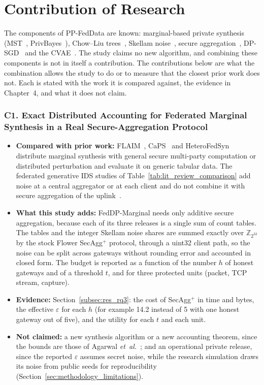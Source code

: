\section{Contribution of Research}\label{sec:contribution}
The components of PP-FedData are known: marginal-based private synthesis (MST~\cite{mckenna2021mst}, PrivBayes~\cite{zhang2017privbayes}), Chow--Liu trees~\cite{chow1968}, Skellam noise~\cite{agarwal2021}, secure aggregation~\cite{bell2020}, DP-SGD~\cite{abadi2016dpsgd} and the CVAE~\cite{sohn2015cvae}. The study claims no new algorithm, and combining these components is not in itself a contribution. The contributions below are what the combination allows the study to do or to measure that the closest prior work does not. Each is stated with the work it is compared against, the evidence in Chapter~4, and what it does not claim.

\subsubsection*{C1. Exact Distributed Accounting for Federated Marginal Synthesis in a Real Secure-Aggregation Protocol}
\begin{itemize}
    \item \textbf{Compared with prior work:} FLAIM~\cite{maddock2024}, CaPS~\cite{pentyala2024} and HeteroFedSyn~\cite{li2026} distribute marginal synthesis with general secure multi-party computation or distributed perturbation and evaluate it on generic tabular data. The federated generative IDS studies of Table~\ref{tab:lit_review_comparison} add noise at a central aggregator or at each client and do not combine it with secure aggregation of the uplink~\cite{yao2024, salim2025, jiao2025, shettar2026}.
    \item \textbf{What this study adds:} FedDP-Marginal needs only additive secure aggregation, because each of its three releases is a single sum of count tables. The tables and the integer Skellam noise shares are summed exactly over $\mathbb{Z}_{2^{32}}$ by the stock Flower SecAgg$^+$ protocol, through a uint32 client path, so the noise can be split across gateways without rounding error and accounted in closed form. The budget is reported as a function of the number $h$ of honest gateways and of a threshold $t$, and for three protected units (packet, TCP stream, capture).
    \item \textbf{Evidence:} Section~\ref{subsec:res_rq3}: the cost of SecAgg$^+$ in time and bytes, the effective $\varepsilon$ for each $h$ (for example 14.2 instead of 5 with one honest gateway out of five), and the utility for each $t$ and each unit.
    \item \textbf{Not claimed:} a new synthesis algorithm or a new accounting theorem, since the bounds are those of Agarwal \textit{et~al.}~\cite{agarwal2021}; and an operational private release, since the reported $\varepsilon$ assumes secret noise, while the research simulation draws its noise from public seeds for reproducibility (Section~\ref{sec:methodology_limitations}).
\end{itemize}

